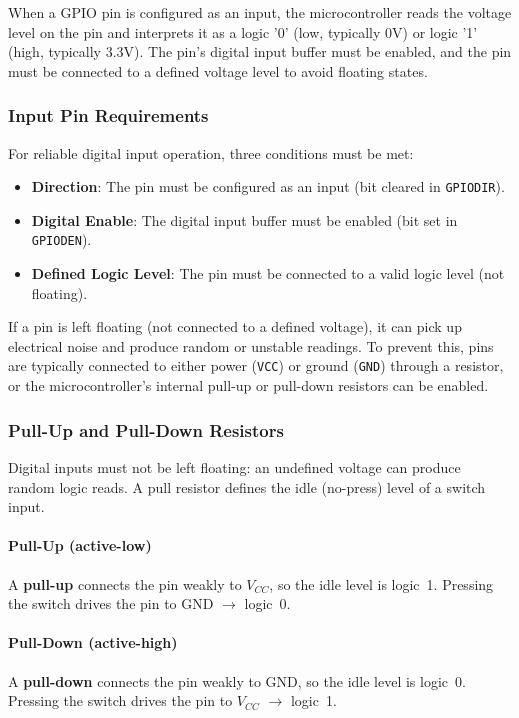 When a GPIO pin is configured as an input, the microcontroller reads the voltage level on the pin and interprets it as a logic '0' (low, typically 0V) or logic '1' (high, typically 3.3V). The pin's digital input buffer must be enabled, and the pin must be connected to a defined voltage level to avoid floating states.

\subsubsection{Input Pin Requirements}

For reliable digital input operation, three conditions must be met:
\begin{itemize}[nosep]
  \item \textbf{Direction}: The pin must be configured as an input (bit cleared in \texttt{GPIODIR}).
  \item \textbf{Digital Enable}: The digital input buffer must be enabled (bit set in \texttt{GPIODEN}).
  \item \textbf{Defined Logic Level}: The pin must be connected to a valid logic level (not floating).
\end{itemize}

\noindent
If a pin is left floating (not connected to a defined voltage), it can pick up electrical noise and produce random or unstable readings. To prevent this, pins are typically connected to either power (\texttt{VCC}) or ground (\texttt{GND}) through a resistor, or the microcontroller's internal pull-up or pull-down resistors can be enabled.

\subsubsection{Pull-Up and Pull-Down Resistors}
\label{sec:pull-resistors}

Digital inputs must not be left floating: an undefined voltage can produce random logic reads. A pull resistor defines the idle (no-press) level of a switch input.

\paragraph{Pull-Up (active-low)}
A \textbf{pull-up} connects the pin weakly to $V_{CC}$, so the idle level is logic~1. Pressing the switch drives the pin to GND $\rightarrow$ logic~0.

\paragraph{Pull-Down (active-high)}
A \textbf{pull-down} connects the pin weakly to GND, so the idle level is logic~0. Pressing the switch drives the pin to $V_{CC}$ $\rightarrow$ logic~1.


